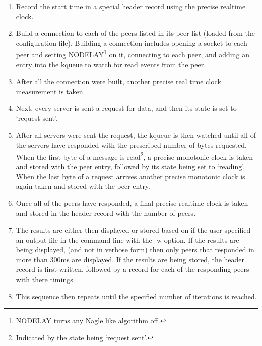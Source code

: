 \documentclass[12pt]{article}
\begin{document}
\begin{enumerate}

\item Record the start time in a special header record using the precise realtime clock.

\item Build a connection to each of the peers listed in its peer list (loaded from the configuration
file). Building a connection includes opening a socket to each peer and setting NODELAY\footnote{NODELAY turns 
any Nagle\cite{rfc896} like algorithm off.} on it, connecting to each peer, and adding an entry into 
the kqueue to watch for read events from the peer.

\item After all the connection were built, another precise real time clock measurement is
taken.

\item Next, every server is sent a request for data, and then its state is set to `request sent'.

\item After all servers were sent the request, the kqueue is then watched until all of the servers
have responded with the prescribed number of bytes requested. When the first byte of a
message is read\footnote{Indicated by the state being `request sent'.}, a precise monotonic clock
is taken and stored with the peer entry, followed by its state being set to `reading'. When the last byte of a request arrives another 
precise monotonic clock is again taken and stored with the peer entry.

\item Once all of the peers have responded, a final precise realtime clock is taken and stored
in the header record with the number of peers.

\item The results are either then displayed or stored based on
if the user specified an output file in the command line with the -w option. If the results are being
displayed, (and not in verbose form) then only peers that responded in more than 300ms are displayed.
If the results are being stored, the header record is first written, followed by a record for each of the
responding peers with there timings.

\item This sequence then repeats until the specified number of iterations is reached.

\end{enumerate}
\end{document}
